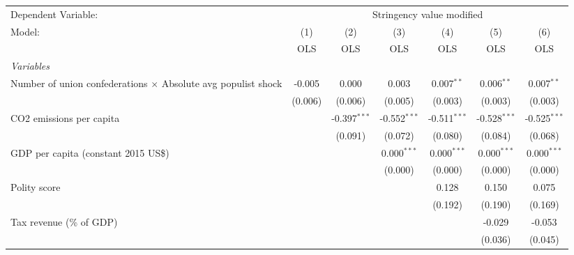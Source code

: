 
\begingroup
\centering
\begin{tabular}{lcccccc}
   \toprule
   Dependent Variable: & \multicolumn{6}{c}{Stringency value modified}\\
   Model:                                                               & (1)     & (2)            & (3)            & (4)            & (5)            & (6)\\  
                                                                        &  OLS    & OLS            & OLS            & OLS            & OLS            & OLS\\  
   \midrule
   \emph{Variables}\\
   Number of union confederations $\times$ Absolute avg populist shock  & -0.005  & 0.000          & 0.003          & 0.007$^{**}$   & 0.006$^{**}$   & 0.007$^{**}$\\   
                                                                        & (0.006) & (0.006)        & (0.005)        & (0.003)        & (0.003)        & (0.003)\\   
   CO2 emissions per capita                                             &         & -0.397$^{***}$ & -0.552$^{***}$ & -0.511$^{***}$ & -0.528$^{***}$ & -0.525$^{***}$\\   
                                                                        &         & (0.091)        & (0.072)        & (0.080)        & (0.084)        & (0.068)\\   
   GDP per capita (constant 2015 US\$)                                  &         &                & 0.000$^{***}$  & 0.000$^{***}$  & 0.000$^{***}$  & 0.000$^{***}$\\   
                                                                        &         &                & (0.000)        & (0.000)        & (0.000)        & (0.000)\\   
   Polity score                                                         &         &                &                & 0.128          & 0.150          & 0.075\\   
                                                                        &         &                &                & (0.192)        & (0.190)        & (0.169)\\   
   Tax revenue (\% of GDP)                                              &         &                &                &                & -0.029         & -0.053\\   
                                                                        &         &                &                &                & (0.036)        & (0.045)\\   

\end{tabular}
